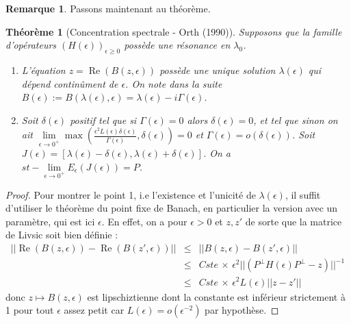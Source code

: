 \documentclass[12pt,openany,a4paper, titlepage]{article}
\newcommand{\f}[2]{\frac{#1}{#2}}
\newcommand{\lp}{\left(}
\newcommand{\rp}{\right)}
\newtheorem{theo}{Théorème}
\theoremstyle{definition}
\theoremstyle{definition}
\theoremstyle{definition}
\theoremstyle{definition}
\theoremstyle{definition}
\newtheorem{rem}{Remarque}
\theoremstyle{definition}
\begin{document}
\begin{rem}
Passons maintenant au théorème.
\begin{theo}[Concentration spectrale - Orth (1990)]
    Supposons que la famille d'opérateurs $(H(\epsilon))_{\epsilon \geq 0}$ possède une résonance en $\lambda_0$. 
    \begin{enumerate}
        \item L'équation $z = \operatorname{Re}(B(z,\epsilon))$ possède une unique solution $\lambda(\epsilon)$ qui dépend continûment de $\epsilon$. On note dans la suite $B(\epsilon) := B(\lambda(\epsilon),\epsilon) = \lambda(\epsilon) - i\Gamma(\epsilon)$.
        \item Soit $\delta(\epsilon)$ positif tel que si $\Gamma(\epsilon) = 0$ alors $\delta(\epsilon) = 0$, et tel que sinon on ait
        $\lim\limits_{\epsilon\rightarrow 0^+}\max\lp \f{\epsilon^2L(\epsilon)\delta(\epsilon)}{\Gamma(\epsilon)}, \delta(\epsilon) \rp = 0$ et  $\Gamma(\epsilon) = o(\delta(\epsilon))$. Soit $J(\epsilon) = [\lambda(\epsilon) - \delta(\epsilon), \lambda(\epsilon) + \delta(\epsilon)]$. On a $st-\lim\limits_{\epsilon\rightarrow 0^+} E_{\epsilon}(J(\epsilon)) = P$.
    \end{enumerate}
\end{theo}

\begin{proof}
Pour montrer le point 1, i.e l'existence et l'unicité de $\lambda(\epsilon)$, il suffit d'utiliser le théorème du point fixe de Banach, en particulier la version avec un paramètre, qui est ici $\epsilon$. En effet, on a pour $\epsilon > 0$ et $z,z'$ de sorte que la matrice de Livsic soit bien définie :
\begin{eqnarray}
    ||\operatorname{Re}(B(z,\epsilon)) - \operatorname{Re}(B(z',\epsilon))|| &\leq& ||B(z,\epsilon) - B(z',\epsilon)|| \\
    &\leq& Cste \, \times \, \epsilon ^ 2 ||\lp P^\perp H(\epsilon) P^\perp - z \rp ||^{-1} \\
    &\leq& Cste \, \times \, \epsilon ^ 2 L(\epsilon) ||z - z'||
\end{eqnarray}
donc $z\mapsto B(z,\epsilon)$ est lipschiztienne dont la constante est inférieur strictement à 1 pour tout $\epsilon$ assez petit car $L(\epsilon) = o(\epsilon^{-2})$ par hypothèse.


\end{proof}
\end{rem}
\end{document}
